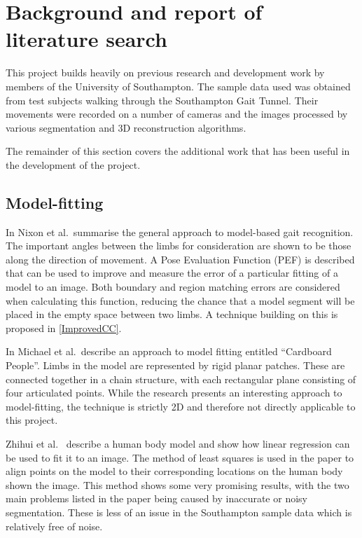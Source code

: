 \section{Background and report of literature search}

This project builds heavily on previous research and development work by members of the University of Southampton.
The sample data used was obtained from test subjects walking through the Southampton Gait Tunnel.
Their movements were recorded on a number of cameras and the images processed by various segmentation and 3D reconstruction algorithms.

The remainder of this section covers the additional work that has been useful in the development of the project.

\subsection{Model-fitting}

In \cite{GaitBook} Nixon et al.\ summarise the general approach to model-based gait recognition.
The important angles between the limbs for consideration are shown to be those along the direction of movement.
A Pose Evaluation Function (PEF) is described that can be used to improve and measure the error of a particular fitting of a model to an image.
Both boundary and region matching errors are considered when calculating this function, reducing the chance that a model segment will be placed in the empty space between two limbs.
A technique building on this is proposed in \ref{ImprovedCC}.

\bigskip
\noindent In \cite{cardboardpeople} Michael et al.\ describe an approach to model fitting entitled ``Cardboard People''.
Limbs in the model are represented by rigid planar patches.
These are connected together in a chain structure, with each rectangular plane consisting of four articulated points.
While the research presents an interesting approach to model-fitting, the technique is strictly 2D and therefore not directly applicable to this project.

\bigskip
\noindent Zhihui et al.\ \cite{LinearModelFitting} describe a human body model and show how linear regression can be used to fit it to an image.
The method of least squares is used in the paper to align points on the model to their corresponding locations on the human body shown the image.
This method shows some very promising results, with the two main problems listed in the paper being caused by inaccurate or noisy segmentation.
These is less of an issue in the Southampton sample data which is relatively free of noise.

